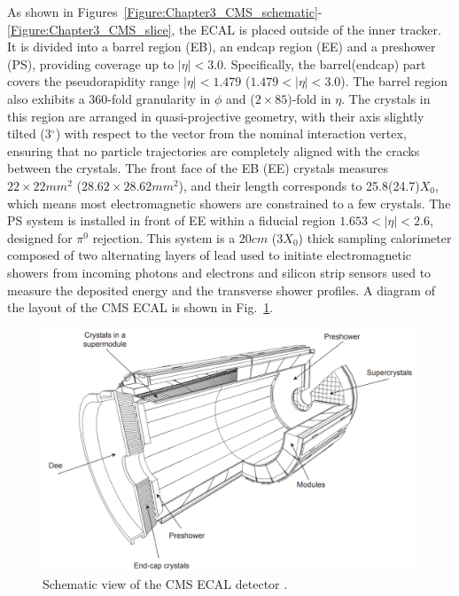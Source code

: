As shown in Figures~\ref{Figure:Chapter3_CMS_schematic}-\ref{Figure:Chapter3_CMS_slice}, the ECAL is placed outside of the inner tracker. It is divided into a barrel region (EB), an endcap region (EE) and a preshower (PS), providing coverage up to $|\eta| < 3.0$. Specifically, the barrel(endcap) part covers the pseudorapidity range $|\eta| < 1.479$ ($1.479<|\eta| < 3.0$). The barrel region also exhibits a 360-fold granularity in $\phi$ and ($2\times85$)-fold in $\eta$. The crystals in this region are arranged in quasi-projective geometry, with their axis slightly tilted (3$^\circ$) with respect to the vector from the nominal interaction vertex, ensuring that no particle trajectories are completely aligned with the cracks between the crystals. The front face of the EB (EE) crystals measures $22\times22\unit{mm}^2$ ($28.62\times28.62\unit{mm}^2$), and their length corresponds to 25.8(24.7)$X_0$, which means most electromagnetic showers are constrained to a few crystals. The PS system is installed in front of EE within a fiducial region $1.653<|\eta| < 2.6$, designed for $\pi^0$ rejection. This system is a $20\unit{cm}$ ($3X_0$) thick sampling calorimeter composed of two alternating layers of lead used to initiate electromagnetic showers from incoming photons and electrons and silicon strip sensors used to measure the deposited energy and the transverse shower profiles.  A diagram of the layout of the CMS ECAL is shown in Fig.~\ref{Figure:Chapter3_CMS_ECAL}.

\begin{figure}[h]
\centering
\includegraphics[width= 1.0\textwidth]{Figures/Chapter3/CMS_ECAL.pdf}
\caption{Schematic view of the CMS ECAL detector \cite{LHC_CMS}.}
\label{Figure:Chapter3_CMS_ECAL}
\end{figure}

